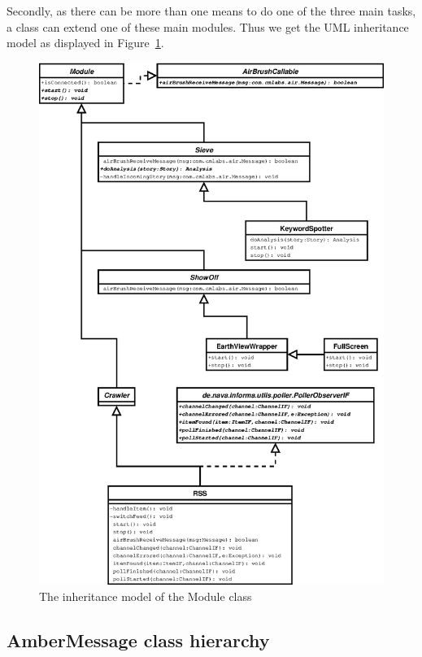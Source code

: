 Secondly, as there can be more than one means to do one of the three main
tasks, a class can extend one of these main modules. Thus we get the UML
inheritance model as displayed in Figure~\ref{fig:class-diagram-module}.

\begin{figure}[htp]
  \centering
  \includegraphics{design/image/class-diagram-module}
  \caption{
    \label{fig:class-diagram-module}
    The inheritance model of the Module class}
\end{figure}

\subsection{AmberMessage class hierarchy}

